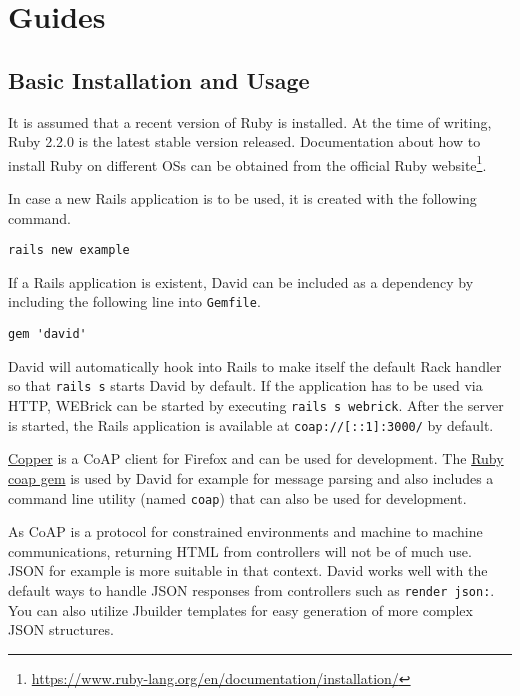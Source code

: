 \chapter{Guides}
\label{cha:guides}

\section{Basic Installation and Usage}

	It is assumed that a recent version of Ruby is installed. At the time of
	writing, Ruby 2.2.0 is the latest stable version released. Documentation
	about how to install Ruby on different \acp{OS} can be obtained from the
	official Ruby
	website\footnote{\url{https://www.ruby-lang.org/en/documentation/installation/}}.

	In case a new \ac{Rails} application is to be used, it is created with the
	following command.

	\begin{lstlisting}[gobble=4]
		rails new example
	\end{lstlisting}

	If a \ac{Rails} application is existent, David can be included as a
	dependency by including the following line into \texttt{Gemfile}.

	\begin{lstlisting}[gobble=4]
		gem 'david'
	\end{lstlisting}

	David will automatically hook into Rails to make itself the default Rack
	handler so that \texttt{rails s} starts David by default. If the
	application has to be used via \ac{HTTP}, WEBrick can be started by
	executing \texttt{rails s webrick}. After the server is started, the
	\ac{Rails} application is available at \texttt{coap://[::1]:3000/} by
	default.

	\href{https://addons.mozilla.org/de/firefox/addon/copper-270430/}{Copper}
	is a \ac{CoAP} client for Firefox and can be used for development. The
	\href{https://github.com/nning/coap}{Ruby coap gem} is used by David for
	example for message parsing and also includes a command line utility (named
	\texttt{coap}) that can also be used for development.

	As \ac{CoAP} is a protocol for constrained environments and machine to
	machine communications, returning \ac{HTML} from controllers will not be of
	much use. \ac{JSON} for example is more suitable in that context.  David
	works well with the default ways to handle \ac{JSON} responses from
	controllers such as \texttt{render json:}. You can also utilize Jbuilder
	templates for easy generation of more complex \ac{JSON} structures.

